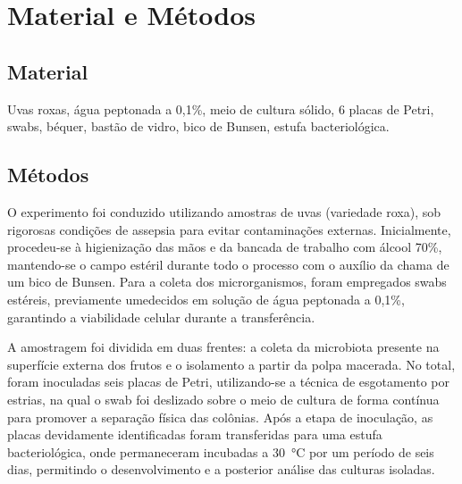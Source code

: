 
\section{Material e Métodos}

\subsection{Material}

Uvas roxas, água peptonada a 0,1\%, meio de cultura sólido, 6 placas de Petri, swabs, béquer, bastão de vidro, bico de Bunsen, estufa bacteriológica.

\subsection{Métodos}

O experimento foi conduzido utilizando amostras de uvas (variedade roxa), sob rigorosas condições de assepsia para evitar contaminações externas. Inicialmente, procedeu-se à higienização das mãos e da bancada de trabalho com álcool 70\%, mantendo-se o campo estéril durante todo o processo com o auxílio da chama de um bico de Bunsen. Para a coleta dos microrganismos, foram empregados swabs estéreis, previamente umedecidos em solução de água peptonada a 0,1\%, garantindo a viabilidade celular durante a transferência.

A amostragem foi dividida em duas frentes: a coleta da microbiota presente na superfície externa dos frutos e o isolamento a partir da polpa macerada. No total, foram inoculadas seis placas de Petri, utilizando-se a técnica de esgotamento por estrias, na qual o swab foi deslizado sobre o meio de cultura de forma contínua para promover a separação física das colônias. Após a etapa de inoculação, as placas devidamente identificadas foram transferidas para uma estufa bacteriológica, onde permaneceram incubadas a 30~°C por um período de seis dias, permitindo o desenvolvimento e a posterior análise das culturas isoladas.
